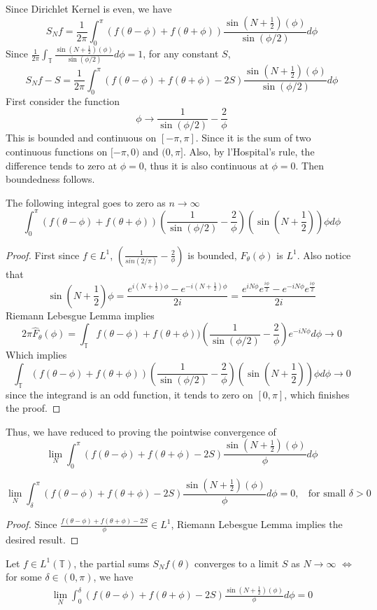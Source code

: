 \documentclass[12pt]{article}
\newenvironment{theorem}[1][Theorem.]{\begin{trivlist}
\item[\hskip \labelsep {\bfseries #1}]}{\end{trivlist}}
\newenvironment{proposition}[1][Proposition.]{\begin{trivlist}
\item[\hskip \labelsep {\bfseries #1}]}{\end{trivlist}}
\newenvironment{lemma}[1][Lemma.]{\begin{trivlist}
\item[\hskip \labelsep {\bfseries #1}]}{\end{trivlist}}
\begin{document}
Since Dirichlet Kernel is even, we have 
\[
S_Nf = \frac{1}{2\pi}\int_{0}^{\pi}(f(\theta -\phi)+f(\theta +\phi))\frac{\sin(N+\frac{1}{2})(\phi)}{\sin(\phi/2)}d\phi
\]
Since $\frac{1}{2\pi}\int_{\mathbb{T}}\frac{\sin(N+\frac{1}{2})(\phi)}{\sin(\phi/2)}d\phi = 1$, for any constant $S$,
\[
S_Nf - S= \frac{1}{2\pi}\int_{0}^{\pi}(f(\theta -\phi)+f(\theta +\phi) - 2S)\frac{\sin(N+\frac{1}{2})(\phi)}{\sin(\phi/2)}d\phi
\]
First consider the function
\[
\phi \rightarrow \frac{1}{\sin(\phi/2)}-\frac{2}{\phi}
\]
This is bounded and continuous on $[-\pi, \pi]$. Since it is the sum of two continuous functions on $[-\pi,0)$ and $(0,\pi]$. Also, by l'Hospital's rule, the difference tends to zero at $\phi = 0$, thus it is also continuous at $\phi = 0$. Then boundedness follows. 
\begin{proposition}
The following integral goes to zero as $n \rightarrow \infty$ 
\[
\int_{0}^{\pi}(f(\theta -\phi)+f(\theta +\phi))(\frac{1}{\sin(\phi/2)}-\frac{2}{\phi})(\sin(N+\frac{1}{2}))\phi d\phi
\]
\end{proposition}
\begin{proof}
First since $f \in L^1$, $(\frac{1}{sin(2/\pi)}-\frac{2}{\phi})$ is bounded, $F_{\theta}(\phi)$ is $L^1$. Also notice that 
\[
\sin(N+\frac{1}{2})\phi = \frac{e^{i(N+\frac{1}{2})\phi} - e^{-i(N+\frac{1}{2})\phi}}{2i} = \frac{e^{iN\phi}e^{\frac{i\phi}{2}} - e^{-iN\phi}e^{\frac{i\phi}{2}}}{2i} 
\]
Riemann Lebesgue Lemma implies
\[
2\pi\hat{F}_{\theta}(\phi) = \int_{\mathbb{T}}f(\theta -\phi)+f(\theta +\phi))(\frac{1}{\sin(\phi/2)}-\frac{2}{\phi})e^{-iN\phi}d\phi \rightarrow 0
\]
Which implies
\[
\int_{\mathbb{T}}(f(\theta -\phi)+f(\theta +\phi))(\frac{1}{\sin(\phi/2)}-\frac{2}{\phi})(\sin(N+\frac{1}{2}))\phi d\phi \rightarrow 0
\]
since the integrand is an odd function, it tends to zero on $[0,\pi]$, which finishes the proof.
\end{proof}
Thus, we have reduced to proving the pointwise convergence of 
\[
\lim\limits _{N}\int_{0}^{\pi}(f(\theta -\phi)+f(\theta +\phi) - 2S)\frac{\sin(N+\frac{1}{2})(\phi)}{\phi}d\phi
\]
\begin{lemma}
\[
\lim\limits _{N}\int_{\delta}^{\pi}(f(\theta -\phi)+f(\theta +\phi) - 2S)\frac{\sin(N+\frac{1}{2})(\phi)}{\phi}d\phi = 0, \ \ \ \  \text{for small $\delta > 0$}
\]
\end{lemma}
\begin{proof}
Since $\frac{f(\theta -\phi)+f(\theta +\phi) - 2S}{\phi} \in L^1$, Riemann Lebesgue Lemma implies the desired result.
\end{proof}
\begin{theorem}
Let $f \in L^1(\mathbb{T})$, the partial sums $S_Nf(\theta)$ converges to a limit $S$ as $N \rightarrow \infty$ $\Leftrightarrow$ for some $\delta \in (0,\pi)$, we have 
\begin{align*}
\lim\limits _{N}\int_{0}^{\delta}(f(\theta -\phi)+f(\theta +\phi) - 2S)\frac{\sin(N+\frac{1}{2})(\phi)}{\phi}d\phi  = 0 \tag{*}
\end{align*}
\end{theorem}
\end{document}
